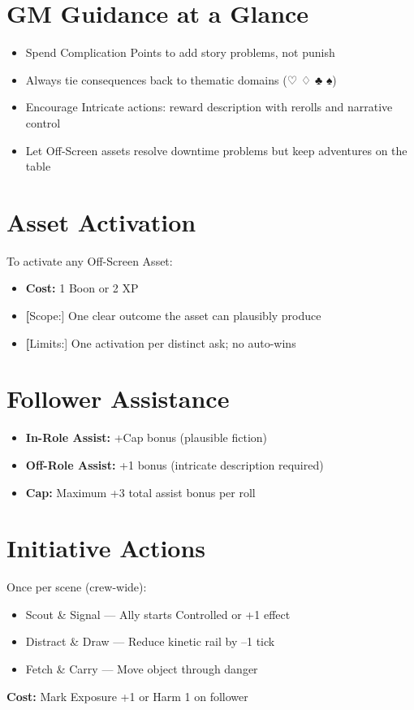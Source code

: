 \section{GM Guidance at a Glance}

\begin{itemize}
  \item Spend Complication Points to add story problems, not punish
  \item Always tie consequences back to thematic domains (♡ ♢ ♣ ♠)
  \item Encourage Intricate actions: reward description with rerolls and narrative control
  \item Let Off-Screen assets resolve downtime problems but keep adventures on the table
\end{itemize}

\section{Asset Activation}

To activate any Off-Screen Asset:
\begin{itemize}
  \item \textbf{Cost:} 1 Boon or 2 XP
  \item \textbf[Scope:] One clear outcome the asset can plausibly produce
  \item \textbf[Limits:] One activation per distinct ask; no auto-wins
\end{itemize}

\section{Follower Assistance}

\begin{itemize}
  \item \textbf{In-Role Assist:} +Cap bonus (plausible fiction)
  \item \textbf{Off-Role Assist:} +1 bonus (intricate description required)
  \item \textbf{Cap:} Maximum +3 total assist bonus per roll
\end{itemize}

\section{Initiative Actions}

Once per scene (crew-wide):
\begin{itemize}
  \item Scout \& Signal — Ally starts Controlled or +1 effect
  \item Distract \& Draw — Reduce kinetic rail by –1 tick
  \item Fetch \& Carry — Move object through danger
\end{itemize}
\textbf{Cost:} Mark Exposure +1 or Harm 1 on follower

